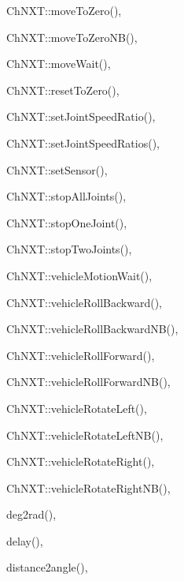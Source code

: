 \begin{theindex}
  \item ChNXT::moveToZero(), 
  \item ChNXT::moveToZeroNB(), 
  \item ChNXT::moveWait(), 
  \item ChNXT::resetToZero(), 
  \item ChNXT::setJointSpeedRatio(), 
  \item ChNXT::setJointSpeedRatios(), 
  \item ChNXT::setSensor(), 
  \item ChNXT::stopAllJoints(), 
  \item ChNXT::stopOneJoint(), 
  \item ChNXT::stopTwoJoints(), 
  \item ChNXT::vehicleMotionWait(), 
  \item ChNXT::vehicleRollBackward(), 
  \item ChNXT::vehicleRollBackwardNB(), 
  \item ChNXT::vehicleRollForward(), 
  \item ChNXT::vehicleRollForwardNB(), 
  \item ChNXT::vehicleRotateLeft(), 
  \item ChNXT::vehicleRotateLeftNB(), 
  \item ChNXT::vehicleRotateRight(), 
  \item ChNXT::vehicleRotateRightNB(), 

  \indexspace

  \item deg2rad(), 
  \item delay(), 
  \item distance2angle(), 

  \indexspace


\end{theindex}
